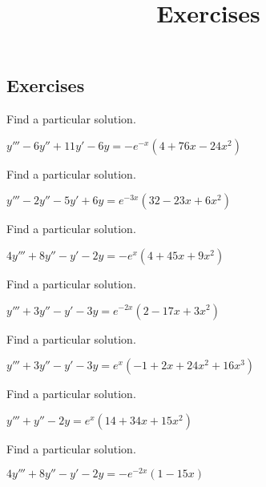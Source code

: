 \documentclass{ximera}
\title{Exercises} \license{CC BY-NC-SA 4.0}
\begin{document}
\begin{abstract}
\end{abstract}
\maketitle

\begin{onlineOnly}
\section*{Exercises}
\end{onlineOnly}




\begin{problem}\label{exer:9.3.1}   Find a particular solution.  

$y'''-6y''+11y'-6y=-e^{-x}(4+76x-24x^2)$
\end{problem}

\begin{problem}\label{exer:9.3.2}   Find a particular solution. 

$y'''-2y''-5y'+6y=e^{-3x}(32-23x+6x^2)$
\end{problem}

\begin{problem}\label{exer:9.3.3}   Find a particular solution.  

$4y'''+8y''-y'-2y=-e^x(4+45x+9x^2)$
\end{problem}

\begin{problem}\label{exer:9.3.4}   Find a particular solution. 

$y'''+3y''-y'-3y=e^{-2x}(2-17x+3x^2)$
\end{problem}

\begin{problem}\label{exer:9.3.5}   Find a particular solution. 

$y'''+3y''-y'-3y=e^x(-1+2x+24x^2+16x^3)$
\end{problem}

\begin{problem}\label{exer:9.3.6}   Find a particular solution.  

$y'''+y''-2y=e^x(14+34x+15x^2)$
\end{problem}

\begin{problem}\label{exer:9.3.7}   Find a particular solution.   

$4y'''+8y''-y'-2y=-e^{-2x}(1-15x)$
\end{problem}
\end{document}
